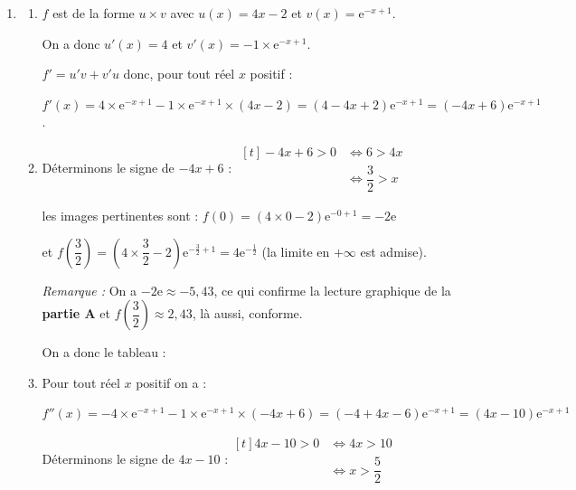 \documentclass[10pt]{article}
\providecommand{\e}{{\mathrm{e}}}
\begin{document}
\begin{enumerate}
	\item
	\begin{enumerate}
		\item  $f$ est de la forme $u\times v$ avec $u(x)=4x-2$ et $v(x)=\e^{-x+1}$.

		On a donc $u'(x)= 4$ et $v'(x)=-1 \times \e^{-x+1}$.

		$f'= u'v + v'u$ donc, pour tout réel $x$ positif :

		 $f'(x) = 4 \times \e^{-x+1} -1 \times \e^{-x+1} \times (4x-2)= (4-4x+2)\e^{-x+1} = (-4x+6)\e^{-x+1}$.

		\item  Déterminons le signe de $-4x+6$ : \quad $\begin{aligned}[t] -4x+6 >0 &\iff  6 > 4x \\
		&\iff \dfrac{3}{2}>x\end{aligned}$

		les images pertinentes sont : \quad
		$f(0)= (4\times 0 -2) \e ^{-0+1}= -2\e$

		et \quad
		$f\left( \dfrac{3}{2}\right)=  \left(4 \times \dfrac{3}{2}-2\right)\e^{-\frac{3}{2}+1}=4\e^{-\frac{1}{2}}$ \quad (la limite en $+\infty$ est admise).

		\emph{Remarque :} On a $-2\e \approx -5,43$, ce qui confirme la lecture graphique de la \textbf{partie A} \linebreak et $ f\left(\dfrac{3}{2}\right)\approx 2,43 $, là aussi, conforme.


		On a donc le tableau :

		\begin{center}
		\end{center}


		\item  Pour tout réel $x$ positif on a :

		$f''(x)= -4 \times \e^{-x+1} -1 \times \e^{-x+1} \times (-4x+6)= (-4+4x-6)\e^{-x+1}= (4x-10)\e^{-x+1}$


		Déterminons le signe de  $4x-10$ :\quad $\begin{aligned}[t] 4x-10 >0 &\iff  4x > 10 \\
		&\iff x>\dfrac{5}{2}\end{aligned}$


\end{enumerate}
\end{enumerate}
\end{document}
